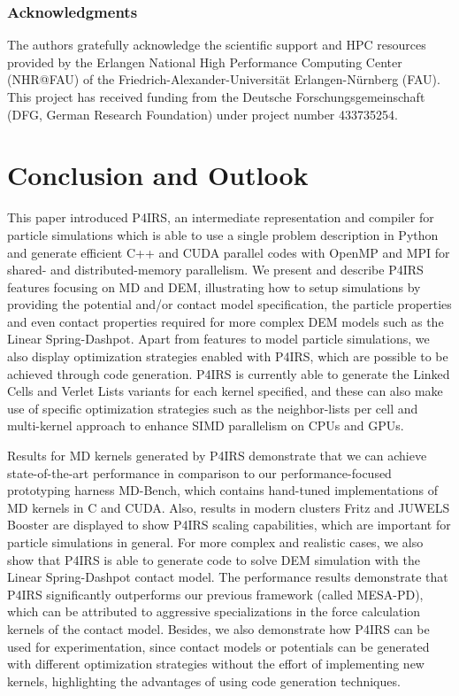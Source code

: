 \documentclass[preprint,12pt]{elsarticle}
\begin{document}
\subsubsection*{Acknowledgments}

The authors gratefully acknowledge the scientific support and HPC resources provided by the Erlangen National High Performance Computing Center (NHR@FAU) of the Friedrich-Alexander-Universität Erlangen-Nürnberg (FAU).
This project has received funding from the Deutsche Forschungsgemeinschaft (DFG, German Research Foundation) under project number 433735254.

\section{Conclusion and Outlook}
\label{sec:conclusion}

This paper introduced P4IRS, an intermediate representation and compiler for particle simulations which is able to use a single problem description in Python and generate efficient C++ and CUDA parallel codes with OpenMP and MPI for shared- and distributed-memory parallelism.
We present and describe P4IRS features focusing on \ac{MD} and \ac{DEM}, illustrating how to setup simulations by providing the potential and/or contact model specification, the particle properties and even contact properties required for more complex DEM models such as the Linear Spring-Dashpot.
Apart from features to model particle simulations, we also display optimization strategies enabled with P4IRS, which are possible to be achieved through code generation.
P4IRS is currently able to generate the Linked Cells and Verlet Lists variants for each kernel specified, and these can also make use of specific optimization strategies such as the neighbor-lists per cell and multi-kernel approach to enhance SIMD parallelism on CPUs and GPUs.

Results for \ac{MD} kernels generated by P4IRS demonstrate that we can achieve state-of-the-art performance in comparison to our performance-focused prototyping harness MD-Bench, which contains hand-tuned implementations of \ac{MD} kernels in C and CUDA.
Also, results in modern clusters Fritz and JUWELS Booster are displayed to show P4IRS scaling capabilities, which are important for particle simulations in general.
For more complex and realistic cases, we also show that P4IRS is able to generate code to solve \ac{DEM} simulation with the Linear Spring-Dashpot contact model.
The performance results demonstrate that P4IRS significantly outperforms our previous framework (called MESA-PD), which can be attributed to aggressive specializations in the force calculation kernels of the contact model.
Besides, we also demonstrate how P4IRS can be used for experimentation, since contact models or potentials can be generated with different optimization strategies without the effort of implementing new kernels, highlighting the advantages of using code generation techniques.
\end{document}

